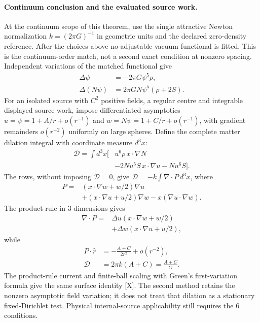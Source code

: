 \paragraph*{Continuum conclusion and the evaluated source work.}
At the continuum scope of this theorem, use the single attractive
Newton normalization $k=(2\pi G)^{-1}$ in geometric units and the
declared zero-density reference.  After the choices above no adjustable
vacuum functional is fitted.  This is the continuum-order match, not
a second exact condition at nonzero spacing.
Independent variations of the matched functional give
\begin{equation}\label{eq:one-h-static-rows}
 \begin{aligned}
 \Delta\psi&=-2\pi G\psi^5\rho,\\
 \Delta(N\psi)&=2\pi GN\psi^5(\rho+2S).
 \end{aligned}
\end{equation}
For an isolated source with $C^2$ positive fields, a regular centre
and integrable displayed source work, impose differentiated asymptotics
$u=\psi=1+A/r+o(r^{-1})$ and
$w=N\psi=1+C/r+o(r^{-1})$, with gradient remainders
$o(r^{-2})$ uniformly on large spheres.  Define the complete matter
dilation integral with coordinate measure $d^3x$:
\begin{equation}\label{eq:bridgeconditions-dilation-work}
 \begin{aligned}
 \mathcal D=\int d^3x\bigl[&u^6\rho\,x\cdot\nabla N\\
 &-2Nu^5S\,x\cdot\nabla u-Nu^6S\bigr].
 \end{aligned}
\end{equation}
The rows, without imposing $\mathcal D=0$, give
$\mathcal D=-k\int\nabla\cdot P\,d^3x$, where
\[
 \begin{aligned}
 P={}&(x\cdot\nabla w+w/2)\nabla u\\
 &+(x\cdot\nabla u+u/2)\nabla w
       -x(\nabla u\cdot\nabla w).
 \end{aligned}
\]
The product rule in 3 dimensions gives
\[
 \begin{aligned}
 \nabla\cdot P={}&\Delta u(x\cdot\nabla w+w/2)\\
                 &+\Delta w(x\cdot\nabla u+u/2),
 \end{aligned}
\]
while
\begin{equation}\label{eq:bridgeconditions-pohozaev-flux}
 \begin{aligned}
 P\cdot\widehat r&=-\frac{A+C}{2r^2}+o(r^{-2}),\\
 \mathcal D&=2\pi k(A+C)=\frac{A+C}{G}.
 \end{aligned}
\end{equation}
The product-rule current and finite-ball scaling with Green's
first-variation formula give the same surface identity [X].
The second method retains the nonzero asymptotic field variation;
it does not treat that dilation as a stationary fixed-Dirichlet test.
Physical internal-source applicability still requires the 6 conditions.

